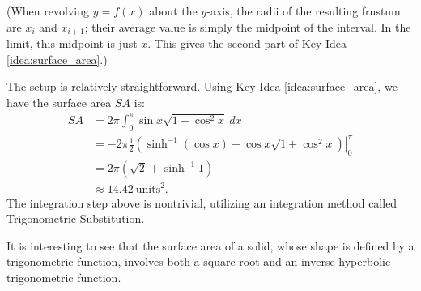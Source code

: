 (When revolving $y=f(x)$ about the $y$-axis, the radii of the resulting frustum are $x_i$ and $x_{i+1}$; their average value is simply the midpoint of the interval. In the limit, this midpoint is just $x$. This gives the second part of Key Idea \ref{idea:surface_area}.)\\

{The setup is relatively straightforward. Using Key Idea \ref{idea:surface_area}, we have the surface area $SA$ is:
\begin{align*}
SA  &=	2\pi\int_0^\pi \sin x\sqrt{1+\cos^2x}\ dx \\
		&=	-2\pi\frac12\left.\left(\sinh^{-1}(\cos x)+\cos x\sqrt{1+\cos^2x}\right)\right|_0^\pi \\
		&= 2\pi\left(\sqrt{2}+\sinh^{-1} 1\right) \\
		&\approx 14.42\ \text{units}^2.
\end{align*}
The integration step above is nontrivial, utilizing an integration method called Trigonometric Substitution. 

It is interesting to see that the surface area of a solid, whose shape is defined by a trigonometric function, involves both a square root and an inverse hyperbolic trigonometric function.
}\\

